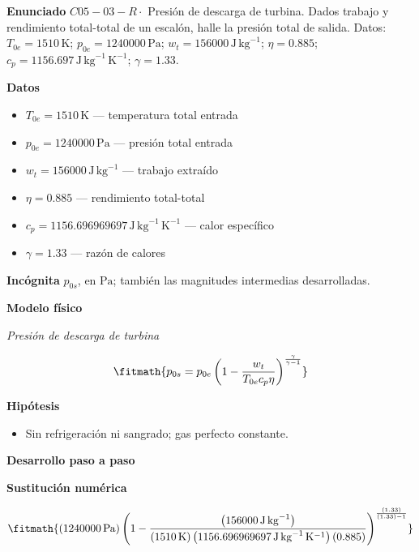 \documentclass[10pt,openany]{book}
\begin{document}
\begin{tcolorbox}[title={Problema resuelto 3}, studiumworked, breakable]

\noindent\textbf{Enunciado}
\(C05-03-R \cdot\) Presión de descarga de turbina. Dados trabajo y rendimiento total-total de un escalón, halle la presión total de salida. Datos: \(T_{0e}=1510\, \mathrm{K}\); \(p_{0e}=1240000\, \mathrm{Pa}\); \(w_t=156000\, \mathrm{J}\,\mathrm{kg}^{-1}\); \(\eta=0.885\); \(c_p=1156.697\, \mathrm{J}\,\mathrm{kg}^{-1}\,\mathrm{K}^{-1}\); \(\gamma=1.33\).

\noindent\textbf{Datos}
\begin{itemize}
\item $T_{0e} = 1510\,\mathrm{K}$ — temperatura total entrada
\item $p_{0e} = 1240000\,\mathrm{Pa}$ — presión total entrada
\item $w_t = 156000\,\mathrm{J}\,\mathrm{kg}^{-1}$ — trabajo extraído
\item $\eta = 0.885$ — rendimiento total-total
\item $c_p = 1156.696969697\,\mathrm{J}\,\mathrm{kg}^{-1}\,\mathrm{K}^{-1}$ — calor específico
\item $\gamma = 1.33$ — razón de calores
\end{itemize}

\noindent\textbf{Incógnita}
$p_{0s}$, en $\mathrm{Pa}$; también las magnitudes intermedias desarrolladas.

\noindent\textbf{Modelo físico}

\noindent\textit{Presión de descarga de turbina}

\[
\fitmath{p_{0s}=p_{0e} \left(1 - \frac{w_t}{T_{0e} c_p \eta}\right)^{\frac{\gamma}{\gamma - 1}}}
\]

\noindent\textbf{Hipótesis}
\begin{itemize}
\item Sin refrigeración ni sangrado; gas perfecto constante.
\end{itemize}

\noindent\textbf{Desarrollo paso a paso}



\noindent\textbf{Sustitución numérica}

\[
\fitmath{\left(1240000\,\mathrm{Pa}\right) \left(1 - \frac{\left(156000\,\mathrm{J}\,\mathrm{kg}^{-1}\right)}{\left(1510\,\mathrm{K}\right) \left(1156.696969697\,\mathrm{J}\,\mathrm{kg}^{-1}\,\mathrm{K}^{-1}\right) \left(0.885\right)}\right)^{\frac{\left(1.33\right)}{\left(1.33\right) - 1}}}
\]


\end{tcolorbox}
\end{document}
